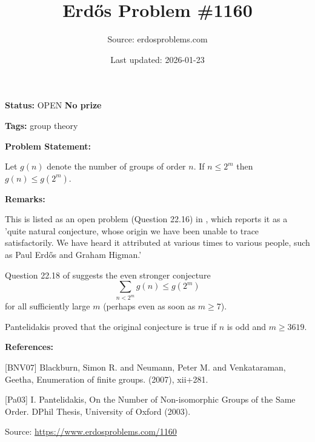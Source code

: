 \documentclass{article}
\title{Erd\H{o}s Problem \#1160}
\date{Last updated: 2026-01-23}
\author{Source: erdosproblems.com}
\begin{document}
\maketitle

\noindent\textbf{Status:} OPEN \quad \textbf{No prize}

\noindent\textbf{Tags:} group theory

\medskip
\noindent\textbf{Problem Statement:}

Let $g(n)$ denote the number of groups of order $n$. If $n\leq 2^m$ then $g(n)\leq g(2^m)$.

\bigskip
\noindent\textbf{Remarks:}

This is listed as an open problem (Question 22.16) in \cite{BNV07}, which reports it as a 'quite natural conjecture, whose origin we have been unable to trace satisfactorily. We have heard it attributed at various times to various people, such as Paul Erd\H{o}s and Graham Higman.'

Question 22.18 of \cite{BNV07} suggests the even stronger conjecture\[\sum_{n<2^m}g(n) \leq g(2^m)\]for all sufficiently large $m$ (perhaps even as soon as $m\geq 7$).

Pantelidakis \cite{Pa03} proved that the original conjecture is true if $n$ is odd and $m\geq 3619$.

\bigskip
\noindent\textbf{References:}

[BNV07] Blackburn, Simon R. and Neumann, Peter M. and Venkataraman,
Geetha, Enumeration of finite groups. (2007), xii+281.
 
 [Pa03] I. Pantelidakis, On the Number of Non-isomorphic Groups of the Same Order. DPhil Thesis, University of Oxford (2003).

\bigskip
\noindent\small{Source: \url{https://www.erdosproblems.com/1160}}
\end{document}
